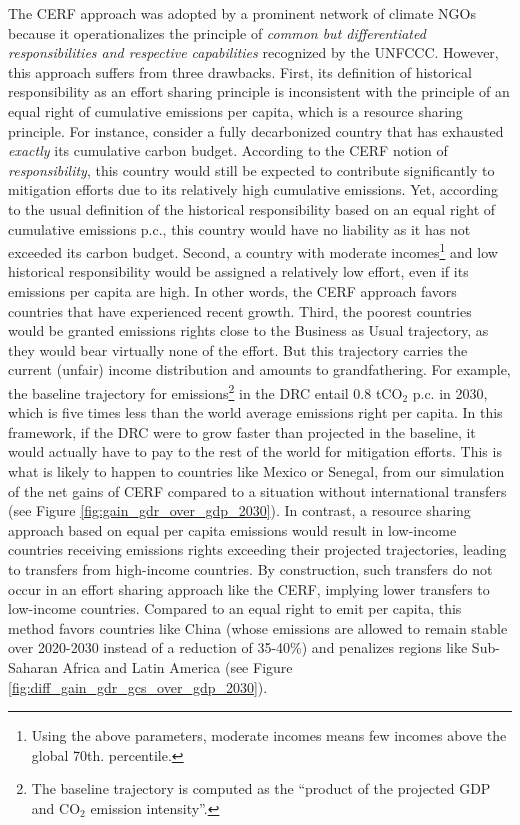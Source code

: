 The CERF %
approach was adopted by a prominent network of climate NGOs because it operationalizes the principle of \textit{common but differentiated responsibilities and respective capabilities} recognized by the UNFCCC. However, this approach suffers from three drawbacks. %
First, its definition of historical responsibility as an effort sharing principle is inconsistent with the principle of an equal right of cumulative emissions per capita, which is a resource sharing principle. For instance, consider a fully decarbonized country that has exhausted \textit{exactly} its cumulative carbon budget. According to the CERF notion of \textit{responsibility}, this country would still be expected to contribute significantly to mitigation efforts due to its relatively high cumulative emissions. Yet, according to the usual definition of the historical responsibility based on an equal right of cumulative emissions p.c., this country would have no liability as it has not exceeded its carbon budget. 
Second, a country with moderate incomes\footnote{Using the above parameters, moderate incomes means few incomes above the global 70th. percentile.} and low historical responsibility would be assigned a relatively low effort, even if its emissions per capita are high. In other words, the CERF %
approach favors countries that have experienced recent growth. %
Third, the poorest countries would be granted emissions rights close to the Business as Usual trajectory, as they would bear virtually none of the effort. But this trajectory carries the current (unfair) income distribution and amounts to grandfathering. For example, the baseline trajectory for emissions\footnote{The baseline trajectory is computed as the ``product of the projected GDP and CO$_\text{2}$ emission intensity''.} in the DRC entail 0.8 tCO$_\text{2}$ p.c. in 2030, %
which is five times less than the world average emissions right per capita. In this framework, if the DRC were to grow faster than projected in the baseline, it would actually have to pay to the rest of the world for mitigation efforts. This is what is likely to happen to countries like Mexico or Senegal, from our simulation of the net gains of CERF compared to a situation without international transfers (see Figure \ref{fig:gain_gdr_over_gdp_2030}). 
In contrast, a resource sharing approach based on equal per capita emissions would result in low-income countries receiving emissions rights exceeding their projected trajectories, leading to transfers from high-income countries. By construction, such transfers do not occur in an effort sharing approach like the CERF, implying lower transfers to low-income countries. %
Compared to an equal right to emit per capita, this method favors countries like China (whose emissions are allowed to remain stable over 2020-2030 instead of a reduction of 35-40\%) and penalizes regions like Sub-Saharan Africa and Latin America (see Figure \ref{fig:diff_gain_gdr_gcs_over_gdp_2030}). 

